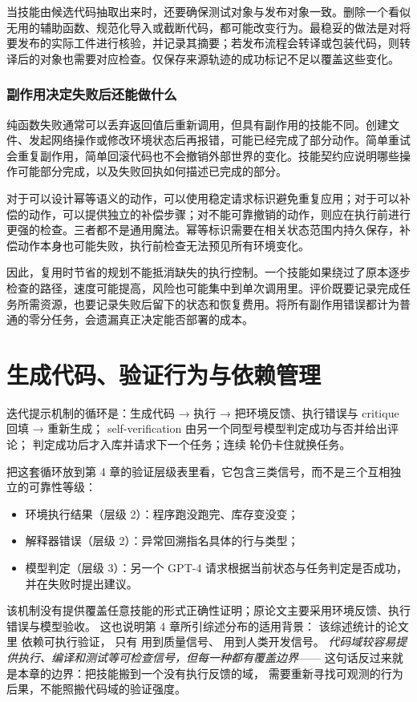 当技能由候选代码抽取出来时，还要确保测试对象与发布对象一致。删除一个看似无用的辅助函数、规范化导入或截断代码，都可能改变行为。最稳妥的做法是对将要发布的实际工件进行核验，并记录其摘要；若发布流程会转译或包装代码，则转译后的对象也需要对应检查。仅保存来源轨迹的成功标记不足以覆盖这些变化。

\subsubsection{副作用决定失败后还能做什么}

纯函数失败通常可以丢弃返回值后重新调用，但具有副作用的技能不同。创建文件、发起网络操作或修改环境状态后再报错，可能已经完成了部分动作。简单重试会重复副作用，简单回滚代码也不会撤销外部世界的变化。技能契约应说明哪些操作可能部分完成，以及失败回执如何描述已完成的部分。

对于可以设计幂等语义的动作，可以使用稳定请求标识避免重复应用；对于可以补偿的动作，可以提供独立的补偿步骤；对不能可靠撤销的动作，则应在执行前进行更强的检查。三者都不是通用魔法。幂等标识需要在相关状态范围内持久保存，补偿动作本身也可能失败，执行前检查无法预见所有环境变化。

因此，复用时节省的规划不能抵消缺失的执行控制。一个技能如果绕过了原本逐步检查的路径，速度可能提高，风险也可能集中到单次调用里。评价既要记录完成任务所需资源，也要记录失败后留下的状态和恢复费用。将所有副作用错误都计为普通的零分任务，会遗漏真正决定能否部署的成本。

\section{生成代码、验证行为与依赖管理}
\label{sec:ch08-verify}

迭代提示机制的循环是：生成代码 → 执行 → 把环境反馈、执行错误与 critique 回填 → 重新生成；
self-verification 由另一个同型号模型判定成功与否并给出评论；
判定成功后才入库并请求下一个任务；连续  轮仍卡住就换任务\cite{voyager-2305}。

把这套循环放到第 4 章的验证层级表里看，它包含三类信号，而不是三个互相独立的可靠性等级：
\begin{itemize}
  \item 环境执行结果（层级 2）：程序跑没跑完、库存变没变；
  \item 解释器错误（层级 2）：异常回溯指名具体的行与类型；
  \item 模型判定（层级 3）：另一个 GPT-4 请求根据当前状态与任务判定是否成功，并在失败时提出建议。
\end{itemize}
该机制没有提供覆盖任意技能的形式正确性证明；原论文主要采用环境反馈、执行错误与模型验收。
这也说明第 4 章所引综述分布的适用背景：
该综述统计的论文里  依赖可执行验证，
只有  用到质量信号、 用到人类开发信号\cite{coding-survey-2608}。
\emph{代码域较容易提供执行、编译和测试等可检查信号，但每一种都有覆盖边界}——
这句话反过来就是本章的边界：把技能搬到一个没有执行反馈的域，
需要重新寻找可观测的行为后果，不能照搬代码域的验证强度。

